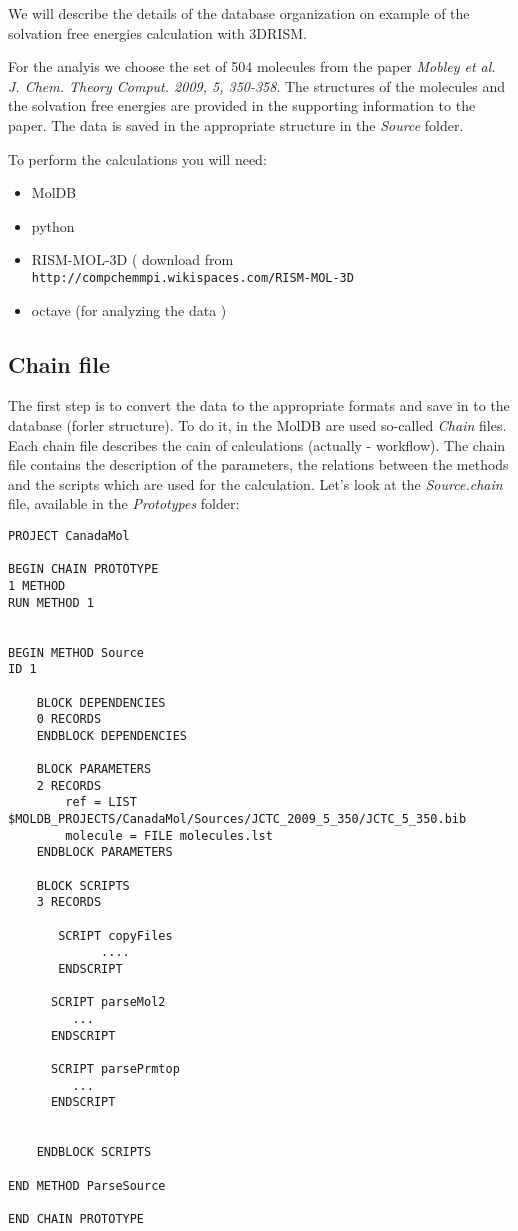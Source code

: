 \documentclass[12pt]{article}
\begin{document}

We will describe the details of the database organization on example of the solvation free energies calculation with 3DRISM.

For the analyis we choose the set of 504 molecules from the paper 
\emph{Mobley et al. J. Chem. Theory Comput. 2009, 5, 350-358}.
The structures of the molecules and the solvation free energies are provided in the supporting information to the paper.
The data is saved in the appropriate structure in the \emph{Source} folder.

To perform the calculations you will need:
\begin{itemize}
 \item MolDB
 \item python
 \item RISM-MOL-3D ( download from \verb#http://compchemmpi.wikispaces.com/RISM-MOL-3D#
 \item octave (for analyzing the data )
\end{itemize}

\subsection{Chain file}

The first step is to convert the data to the appropriate formats and save in to the database (forler structure).
To do it, in the MolDB are used so-called \emph{Chain} files.
Each chain file describes the cain of calculations (actually - workflow).
The chain file contains the description of the parameters, the relations between the methods and the scripts which are used for the calculation.
Let's look at the \emph{Source.chain} file, available in the \emph{Prototypes} folder:

\begin{verbatim}
PROJECT CanadaMol

BEGIN CHAIN PROTOTYPE
1 METHOD
RUN METHOD 1


BEGIN METHOD Source
ID 1

	BLOCK DEPENDENCIES
	0 RECORDS	
	ENDBLOCK DEPENDENCIES

	BLOCK PARAMETERS
	2 RECORDS
		ref = LIST $MOLDB_PROJECTS/CanadaMol/Sources/JCTC_2009_5_350/JCTC_5_350.bib
		molecule = FILE molecules.lst
	ENDBLOCK PARAMETERS

	BLOCK SCRIPTS
	3 RECORDS

       SCRIPT copyFiles
	         ....
   	   ENDSCRIPT	

   	  SCRIPT parseMol2
   	     ...
  	  ENDSCRIPT

	  SCRIPT parsePrmtop
	     ...
	  ENDSCRIPT


	ENDBLOCK SCRIPTS

END METHOD ParseSource

END CHAIN PROTOTYPE
\end{verbatim}
\end{document}
